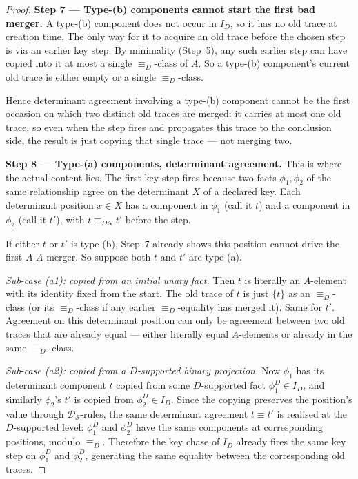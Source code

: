 \documentclass[10pt]{article}
\begin{document}
\begin{proof}
\smallskip\noindent\textbf{Step 7 --- Type-(b) components cannot start
the first bad merger.}
A type-(b) component does not occur in \(I_D\), so it has no old trace
at creation time.  The only way for it to acquire an old trace before
the chosen step is via an earlier key step.  By minimality (Step~5),
any such earlier step can have copied into it at most a single
\(\equiv_D\)-class of \(A\).  So a type-(b) component's current old
trace is either empty or a single \(\equiv_D\)-class.

Hence determinant agreement involving a type-(b) component cannot be
the first occasion on which two distinct old traces are merged: it
carries at most one old trace, so even when the step fires and
propagates this trace to the conclusion side, the result is just
copying that single trace --- not merging two.

\smallskip\noindent\textbf{Step 8 --- Type-(a) components, determinant
agreement.}
This is where the actual content lies.  The first key step fires
because two facts \(\phi_1,\phi_2\) of the same relationship agree on
the determinant \(X\) of a declared key.  Each determinant position
\(x\in X\) has a component in \(\phi_1\) (call it \(t\)) and a
component in \(\phi_2\) (call it \(t'\)), with \(t\equiv_{DN} t'\)
before the step.

If either \(t\) or \(t'\) is type-(b), Step~7 already shows this
position cannot drive the first \(A\)-\(A\) merger.  So suppose both
\(t\) and \(t'\) are type-(a).

\emph{Sub-case (a1): copied from an initial unary fact.}  Then \(t\)
is literally an \(A\)-element with its identity fixed from the start.
The old trace of \(t\) is just \(\{t\}\) as an \(\equiv_D\)-class (or
its \(\equiv_D\)-class if any earlier \(\equiv_D\)-equality has merged
it).  Same for \(t'\).  Agreement on this determinant position can only
be agreement between two old traces that are already equal --- either
literally equal \(A\)-elements or already in the same
\(\equiv_D\)-class.

\emph{Sub-case (a2): copied from a \(D\)-supported binary projection.}
Now \(\phi_1\) has its determinant component \(t\) copied from some
\(D\)-supported fact \(\phi_1^D\in I_D\), and similarly \(\phi_2\)'s
\(t'\) is copied from \(\phi_2^D\in I_D\).  Since the copying preserves
the position's value through \(\mathcal D_{\mathcal S}\)-rules, the same
determinant agreement \(t\equiv t'\) is realised at the
\(D\)-supported level: \(\phi_1^D\) and \(\phi_2^D\) have the same
components at corresponding positions, modulo \(\equiv_D\).  Therefore
the key chase of \(I_D\) already fires the same key step on
\(\phi_1^D\) and \(\phi_2^D\), generating the same equality between the
corresponding old traces.


\end{proof}
\end{document}
